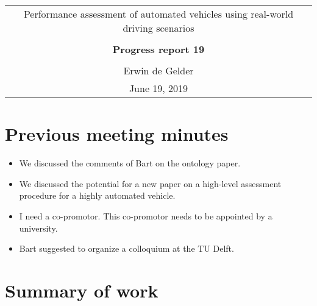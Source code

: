 \documentclass[10pt,final,a4paper,oneside,onecolumn]{article}
\newcommand{\progressreportnumber}{19}
\renewcommand{\author}{Erwin de Gelder}
\renewcommand{\date}{June 19, 2019}
\renewcommand{\title}{Performance assessment of automated vehicles using real-world driving scenarios}
\begin{document}
	
\begin{center}
	\begin{tabular}{c}
		\title \\ \\
		\textbf{\huge Progress report \progressreportnumber} \\ \\
		\author \\ 
		\date
	\end{tabular}
\end{center}

\section{Previous meeting minutes}

\begin{itemize}
	\item We discussed the comments of Bart on the ontology paper.
	\item We discussed the potential for a new paper on a high-level assessment procedure for a highly automated vehicle.
	\item I need a co-promotor. This co-promotor needs to be appointed by a university.
	\item Bart suggested to organize a colloquium at the TU Delft.
\end{itemize}

\section{Summary of work}
\end{document}
